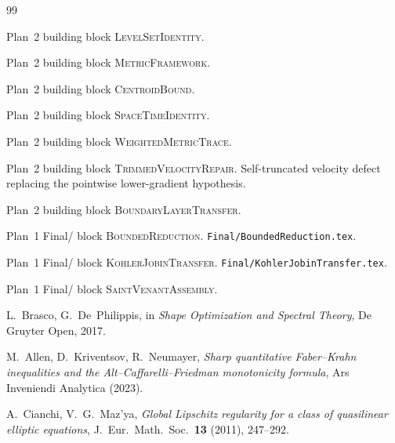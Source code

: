 \documentclass[11pt]{article}
\theoremstyle{definition}
\begin{document}
\begin{thebibliography}{99}

Plan~2 building block \textsc{LevelSetIdentity}.

Plan~2 building block \textsc{MetricFramework}.

Plan~2 building block \textsc{CentroidBound}.

Plan~2 building block \textsc{SpaceTimeIdentity}.

Plan~2 building block \textsc{WeightedMetricTrace}.

Plan~2 building block \textsc{TrimmedVelocityRepair}.
Self-truncated velocity defect replacing the pointwise lower-gradient
hypothesis.

Plan~2 building block \textsc{BoundaryLayerTransfer}.

Plan~1 Final/ block \textsc{BoundedReduction}.
\texttt{Final/BoundedReduction.tex}.

Plan~1 Final/ block \textsc{KohlerJobinTransfer}.
\texttt{Final/KohlerJobinTransfer.tex}.

Plan~1 Final/ block \textsc{SaintVenantAssembly}.

L.~Brasco, G.~De~Philippis, in
\emph{Shape Optimization and Spectral Theory}, De Gruyter Open, 2017.

M.~Allen, D.~Kriventsov, R.~Neumayer,
\emph{Sharp quantitative Faber--Krahn inequalities and the
Alt--Caffarelli--Friedman monotonicity formula}, Ars Inveniendi
Analytica (2023).

A.~Cianchi, V.~G.~Maz'ya,
\emph{Global Lipschitz regularity for a class of quasilinear
elliptic equations}, J.~Eur.~Math.~Soc.\ \textbf{13} (2011), 247--292.

\end{thebibliography}
\end{document}
